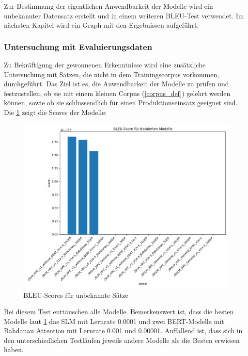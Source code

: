 Zur Bestimmung der eigentlichen Anwendbarkeit der Modelle wird ein unbekannter Datensatz erstellt und in einem weiteren BLEU-Test verwendet. Im nächsten Kapitel wird ein Graph mit den Ergebnissen aufgeführt.

\subsubsection{Untersuchung mit Evaluierungsdaten}

Zu Bekräftigung der gewonnenen Erkenntnisse wird eine zusätzliche Untersuchung mit Sätzen, die nicht in dem Trainingscorpus vorkommen, durchgeführt. Das Ziel ist es, die Anwendbarkeit der Modelle zu prüfen und festzustellen, ob sie mit einem kleinen Corpus (\cref{corpus_def}) gelehrt werden können, sowie ob sie schlussendlich für einen Produktionseinsatz geeignet sind. Die \cref{bleu_score_unseen} zeigt die Scores der Modelle:

\begin{figure}[H]
	\centering
	\includegraphics[scale=0.55]{images/bleu_scores_unseen_4.png}
	\caption{BLEU-Scores für unbekannte Sätze}
	\label{bleu_score_unseen}
\end{figure}

Bei diesem Test enttäuschen alle Modelle. Bemerkenswert ist, dass die besten Modelle laut \cref{bleu_score_unseen} das SLM mit Lernrate 0.0001 und zwei BERT-Modelle mit Bahdanau Attention mit Lernrate 0.001 und 0.00001. Auffallend ist, dass sich in den unterschiedlichen Testläufen jeweils andere Modelle als die Besten erwiesen haben.


